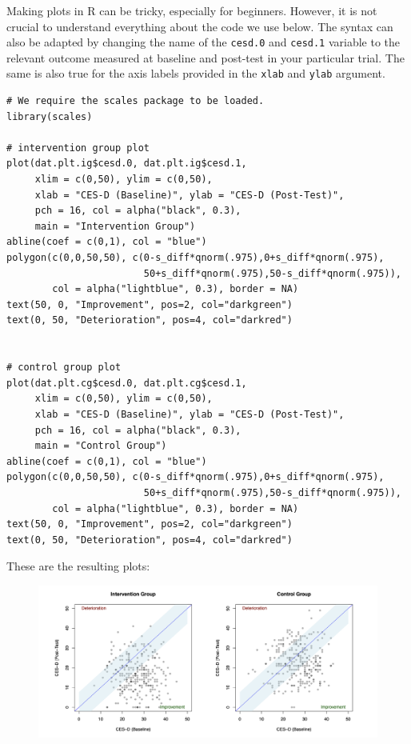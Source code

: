 Making plots in \textsf{R} can be tricky, especially for beginners. However, it is not crucial to understand everything about the code we use below. The syntax can also be adapted by changing the name of the \texttt{cesd.0} and \texttt{cesd.1} variable to the relevant outcome measured at baseline and post-test in your particular trial. The same is also true for the axis labels provided in the \texttt{xlab} and \texttt{ylab} argument.

\begin{lstlisting}
# We require the scales package to be loaded.
library(scales)

# intervention group plot
plot(dat.plt.ig$cesd.0, dat.plt.ig$cesd.1, 
     xlim = c(0,50), ylim = c(0,50),
     xlab = "CES-D (Baseline)", ylab = "CES-D (Post-Test)",
     pch = 16, col = alpha("black", 0.3),
     main = "Intervention Group")
abline(coef = c(0,1), col = "blue")
polygon(c(0,0,50,50), c(0-s_diff*qnorm(.975),0+s_diff*qnorm(.975),
                        50+s_diff*qnorm(.975),50-s_diff*qnorm(.975)), 
        col = alpha("lightblue", 0.3), border = NA)
text(50, 0, "Improvement", pos=2, col="darkgreen")
text(0, 50, "Deterioration", pos=4, col="darkred")


# control group plot
plot(dat.plt.cg$cesd.0, dat.plt.cg$cesd.1, 
     xlim = c(0,50), ylim = c(0,50),
     xlab = "CES-D (Baseline)", ylab = "CES-D (Post-Test)",
     pch = 16, col = alpha("black", 0.3),
     main = "Control Group")
abline(coef = c(0,1), col = "blue")
polygon(c(0,0,50,50), c(0-s_diff*qnorm(.975),0+s_diff*qnorm(.975),
                        50+s_diff*qnorm(.975),50-s_diff*qnorm(.975)), 
        col = alpha("lightblue", 0.3), border = NA)
text(50, 0, "Improvement", pos=2, col="darkgreen")
text(0, 50, "Deterioration", pos=4, col="darkred")
\end{lstlisting}


These are the resulting plots:

\begin{figure}[H]
\includegraphics[width=13cm]{images/rci.png}
\centering
\end{figure}


